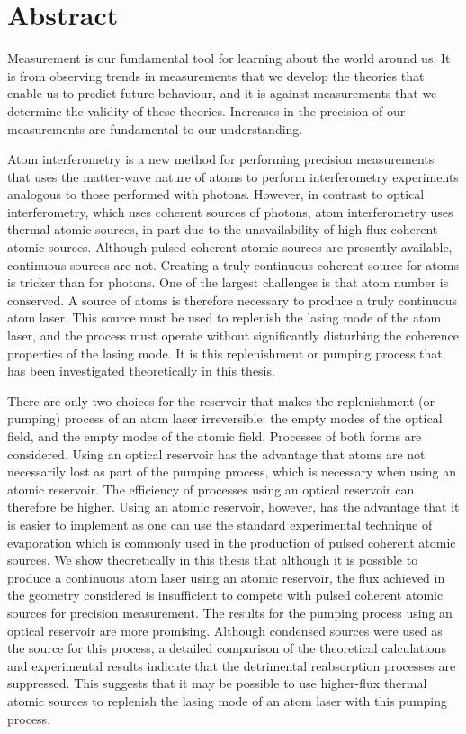 \chapter*{Abstract}
\graphicspath{{Figures/Common/}}


Measurement is our fundamental tool for learning about the world around us.  It is from observing trends in measurements that we develop the theories that enable us to predict future behaviour, and it is against measurements that we determine the validity of these theories.  Increases in the precision of our measurements are fundamental to our understanding.

Atom interferometry is a new method for performing precision measurements that uses the matter-wave nature of atoms to perform interferometry experiments analogous to those performed with photons.  However, in contrast to optical interferometry, which uses coherent sources of photons, atom interferometry uses thermal atomic sources, in part due to the unavailability of high-flux coherent atomic sources.  Although pulsed coherent atomic sources are presently available, continuous sources are not.  Creating a truly continuous coherent source for atoms is tricker than for photons.  One of the largest challenges is that atom number is conserved.  A source of atoms is therefore necessary to produce a truly continuous atom laser.  This source must be used to replenish the lasing mode of the atom laser, and the process must operate without significantly disturbing the coherence properties of the lasing mode.  It is this replenishment or pumping process that has been investigated theoretically in this thesis.

There are only two choices for the reservoir that makes the replenishment (or pumping) process of an atom laser irreversible: the empty modes of the optical field, and the empty modes of the atomic field.  Processes of both forms are considered.  Using an optical reservoir has the advantage that atoms are not necessarily lost as part of the pumping process, which is necessary when using an atomic reservoir.  The efficiency of processes using an optical reservoir can therefore be higher.  Using an atomic reservoir, however, has the advantage that it is easier to implement as one can use the standard experimental technique of evaporation which is commonly used in the production of pulsed coherent atomic sources.  We show theoretically in this thesis that although it is possible to produce a continuous atom laser using an atomic reservoir, the flux achieved in the geometry considered is insufficient to compete with pulsed coherent atomic sources for precision measurement.  The results for the pumping process using an optical reservoir are more promising.  Although condensed sources were used as the source for this process, a detailed comparison of the theoretical calculations and experimental results indicate that the detrimental reabsorption processes are suppressed.  This suggests that it may be possible to use higher-flux thermal atomic sources to replenish the lasing mode of an atom laser with this pumping process.